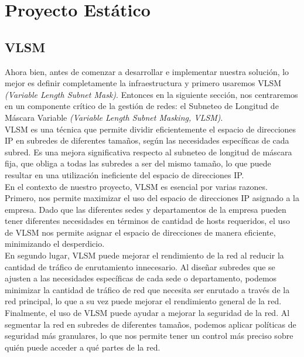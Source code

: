 \section{Proyecto Estático}

\subsection{VLSM}

Ahora bien, antes de comenzar a desarrollar e implementar nuestra solución,
lo mejor es definir completamente la infraestructura y primero usaremos
VLSM \textit{(Variable Length Subnet Mask)}. Entonces en la siguiente sección,
nos centraremos en un componente crítico de la gestión de redes: el Subneteo de
Longitud de Máscara Variable \textit{(Variable Length Subnet Masking, VLSM)}.
\\

VLSM es una técnica que permite dividir eficientemente el espacio de
direcciones IP en subredes de diferentes tamaños, según las necesidades
específicas de cada subred. Es una mejora significativa respecto al subneteo de
longitud de máscara fija, que obliga a todas las subredes a ser del mismo
tamaño, lo que puede resultar en una utilización ineficiente del espacio de
direcciones IP.
\\

En el contexto de nuestro proyecto, VLSM es esencial por varias razones.
Primero, nos permite maximizar el uso del espacio de direcciones IP asignado a
la empresa. Dado que las diferentes sedes y departamentos de la empresa pueden
tener diferentes necesidades en términos de cantidad de hosts requeridos, el uso
de VLSM nos permite asignar el espacio de direcciones de manera eficiente, 
minimizando el desperdicio.
\\

En segundo lugar, VLSM puede mejorar el rendimiento de la red al reducir la
cantidad de tráfico de enrutamiento innecesario. Al diseñar subredes que se
ajusten a las necesidades específicas de cada sede o departamento, podemos
minimizar la cantidad de tráfico de red que necesita ser enrutado a través de la
red principal, lo que a su vez puede mejorar el rendimiento general de la red.
\\

Finalmente, el uso de VLSM puede ayudar a mejorar la seguridad de la red. Al
segmentar la red en subredes de diferentes tamaños, podemos aplicar políticas
de seguridad más granulares, lo que nos permite tener un control más preciso
sobre quién puede acceder a qué partes de la red.
\\

